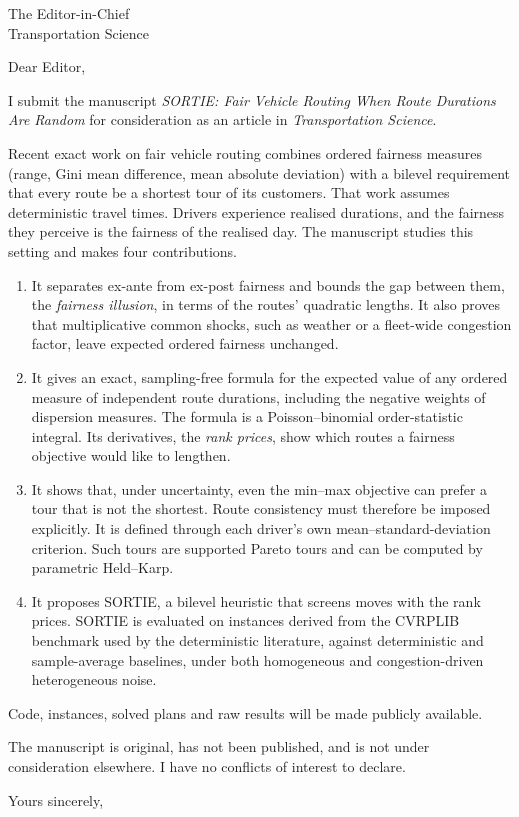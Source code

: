 \documentclass[11pt]{letter}
\begin{document}
\begin{letter}{The Editor-in-Chief\\Transportation Science}
\opening{Dear Editor,}

I submit the manuscript \emph{SORTIE: Fair Vehicle Routing When Route
Durations Are Random} for consideration as an article in
\emph{Transportation Science}.

Recent exact work on fair vehicle routing combines ordered fairness measures
(range, Gini mean difference, mean absolute deviation) with a bilevel
requirement that every route be a shortest tour of its customers. That work
assumes deterministic travel times. Drivers experience realised durations,
and the fairness they perceive is the fairness of the realised day. The
manuscript studies this setting and makes four contributions.

\begin{enumerate}
\item It separates ex-ante from ex-post fairness and bounds the gap between
  them, the \emph{fairness illusion}, in terms of the routes' quadratic
  lengths. It also proves that multiplicative common shocks, such as weather
  or a fleet-wide congestion factor, leave expected ordered fairness
  unchanged.
\item It gives an exact, sampling-free formula for the expected value of any
  ordered measure of independent route durations, including the negative
  weights of dispersion measures. The formula is a Poisson--binomial
  order-statistic integral. Its derivatives, the \emph{rank prices}, show
  which routes a fairness objective would like to lengthen.
\item It shows that, under uncertainty, even the min--max objective can
  prefer a tour that is not the shortest. Route consistency must therefore be
  imposed explicitly. It is defined through each driver's own
  mean--standard-deviation criterion. Such tours are supported Pareto tours
  and can be computed by parametric Held--Karp.
\item It proposes SORTIE, a bilevel heuristic that screens moves with the
  rank prices. SORTIE is evaluated on instances derived from the CVRPLIB
  benchmark used by the deterministic literature, against deterministic and
  sample-average baselines, under both homogeneous and congestion-driven
  heterogeneous noise.
\end{enumerate}

Code, instances, solved plans and raw results will be made publicly
available.

The manuscript is original, has not been published, and is not under
consideration elsewhere. I have no conflicts of interest to declare.

\closing{Yours sincerely,}
\end{letter}
\end{document}
